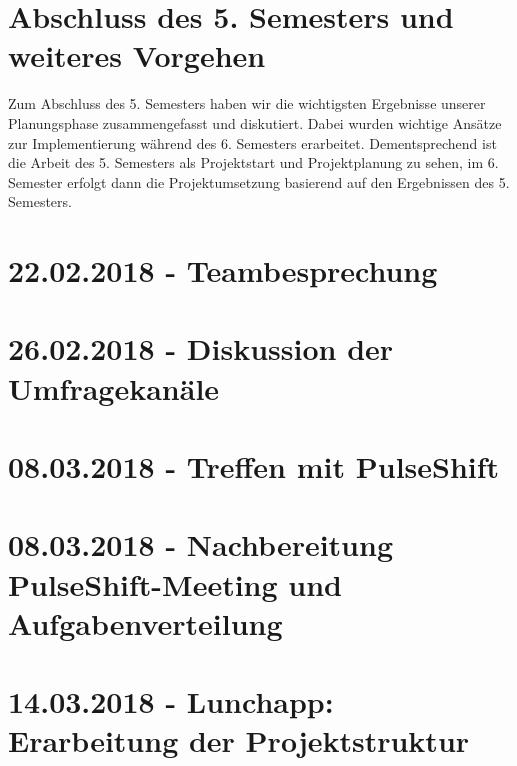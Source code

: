 \section{Abschluss des 5. Semesters und weiteres Vorgehen}
Zum Abschluss des 5. Semesters haben wir die wichtigsten Ergebnisse unserer Planungsphase zusammengefasst und diskutiert. Dabei wurden wichtige Ansätze zur Implementierung während des 6. Semesters erarbeitet. Dementsprechend ist die Arbeit des 5. Semesters als Projektstart und Projektplanung zu sehen, im 6. Semester erfolgt dann die Projektumsetzung basierend auf den Ergebnissen des 5. Semesters.

\section{22.02.2018 - Teambesprechung}

\section{26.02.2018 - Diskussion der Umfragekanäle}

\section{08.03.2018 - Treffen mit PulseShift}
\label{sec:events:definition_of_channels_for_poc}

\section{08.03.2018 - Nachbereitung PulseShift-Meeting und Aufgabenverteilung}

\section{14.03.2018 - Lunchapp: Erarbeitung der Projektstruktur}